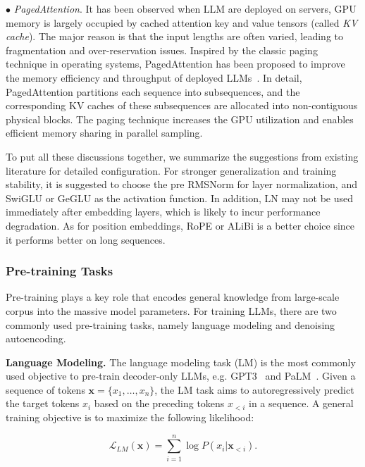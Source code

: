     $\bullet$ \emph{PagedAttention}.  
    {It has been observed when LLM are deployed on servers, GPU memory is largely occupied by cached attention key and value tensors (called \emph{KV cache}). The major reason is that the input lengths are often varied, leading to fragmentation and over-reservation issues. Inspired by the classic paging technique in operating systems, PagedAttention has been proposed to improve the memory efficiency and throughput of deployed LLMs~\cite{vllm-pagedattention}. In detail, PagedAttention partitions each sequence into subsequences, and the corresponding KV caches of these subsequences are allocated into non-contiguous physical blocks. The paging technique increases the GPU utilization  and enables efficient memory sharing in parallel sampling.}

To put all these discussions together, we summarize the suggestions from existing literature for detailed configuration. For stronger generalization and training stability, it is suggested to choose the pre RMSNorm for layer normalization, and SwiGLU or GeGLU as the activation function. {In addition,  LN may not be used immediately after embedding layers, which is likely to incur  performance degradation.} As for position embeddings, {RoPE} or ALiBi is a better choice since it performs better on long sequences. 

\subsubsection{Pre-training Tasks} Pre-training plays a key role that encodes general knowledge from large-scale corpus into the massive model parameters. For training LLMs, there are two commonly used pre-training tasks, namely language modeling and denoising autoencoding. 

\textbf{Language Modeling.} The language modeling task (LM) is the most commonly used objective to pre-train decoder-only LLMs, e.g. GPT3~\cite{Brown-NeurIPS-2020-Language} and PaLM~\cite{Chowdhery-arxiv-2022-PaLM}. Given a sequence of tokens $\mathbf{x}=\{x_1,\dots,x_n\}$, the LM task aims to autoregressively predict the target tokens {$x_i$ based on the preceding tokens $x_{<i}$ in a sequence}. A general  training objective is to maximize the following likelihood:

\begin{equation}
    \mathcal{L}_{LM}(\mathbf{x})=\sum_{i=1}^n \log P(x_i|\mathbf{x}_{<i}).\label{eq:lm}
\end{equation}

